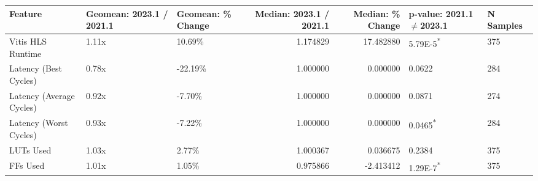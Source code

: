 \begin{tabular}{lllrrll}
\toprule
Feature & Geomean: 2023.1 / 2021.1 & Geomean: \% Change & Median: 2023.1 / 2021.1 & Median: \% Change & p-value: 2021.1$\ne$2023.1 & N Samples \\
\midrule
Vitis HLS Runtime & 1.11x & 10.69\% & 1.174829 & 17.482880 & 5.79E-5\textsuperscript{*} & 375 \\
Latency (Best Cycles) & 0.78x & -22.19\% & 1.000000 & 0.000000 & 0.0622 & 284 \\
Latency (Average Cycles) & 0.92x & -7.70\% & 1.000000 & 0.000000 & 0.0871 & 274 \\
Latency (Worst Cycles) & 0.93x & -7.22\% & 1.000000 & 0.000000 & 0.0465\textsuperscript{*} & 284 \\
LUTs Used & 1.03x & 2.77\% & 1.000367 & 0.036675 & 0.2384 & 375 \\
FFs Used & 1.01x & 1.05\% & 0.975866 & -2.413412 & 1.29E-7\textsuperscript{*} & 375 \\
\bottomrule
\end{tabular}
